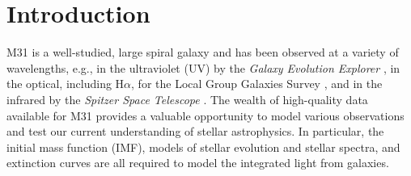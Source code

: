 \documentclass[iop, tighten]{emulateapj}
\begin{document}





\section{Introduction}


M31 is a well-studied, large spiral galaxy and has been observed at a variety of
wavelengths, e.g., in the ultraviolet (UV) by the \emph{Galaxy Evolution
Explorer} \citep[\emph{GALEX};][]{Morrissey:2007}, in the optical, including
H$\alpha$, for the Local Group Galaxies Survey \citep{Massey:2006}, and in the
infrared by the \emph{Spitzer Space Telescope} \citep{Gordon:2006}. The wealth
of high-quality data available for M31 provides a valuable opportunity to model
various observations and test our current understanding of stellar astrophysics.
In particular, the initial mass function (IMF), models of stellar evolution and
stellar spectra, and extinction curves are all required to model the integrated
light from galaxies.



\end{document}
